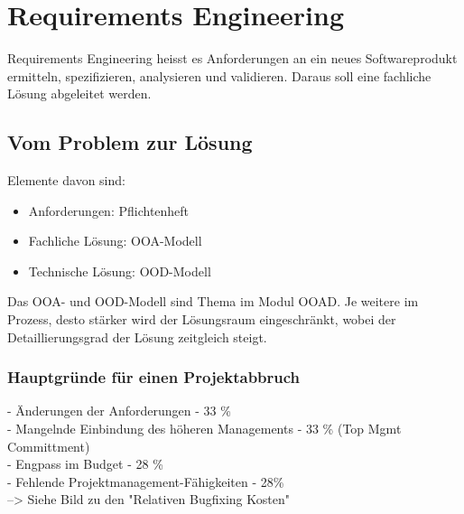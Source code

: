 \chapter{Requirements Engineering}
Requirements Engineering heisst es Anforderungen an ein neues Softwareprodukt ermitteln, spezifizieren, analysieren und validieren. Daraus soll eine fachliche Lösung abgeleitet werden. 

\section{Vom Problem zur Lösung}
\begin{minipage}{10cm}
\end{minipage}
\begin{minipage}{7cm}
	Elemente davon sind: 
	\begin{itemize}
		\item Anforderungen: Pflichtenheft
		\item Fachliche Lösung: OOA-Modell
		\item Technische Lösung: OOD-Modell
	\end{itemize}
Das OOA- und OOD-Modell sind Thema im Modul OOAD. 
Je weitere im Prozess, desto stärker wird der Lösungsraum eingeschränkt, wobei der Detaillierungsgrad der Lösung zeitgleich steigt. 
\end{minipage}

\subsection{Hauptgründe für einen Projektabbruch} 
- Änderungen der Anforderungen - 33 \% \\
- Mangelnde Einbindung des höheren Managements - 33 \% (Top Mgmt Committment) \\
- Engpass im Budget - 28 \% \\
- Fehlende Projektmanagement-Fähigkeiten - 28\% \\
--> Siehe Bild zu den "Relativen Bugfixing Kosten"

